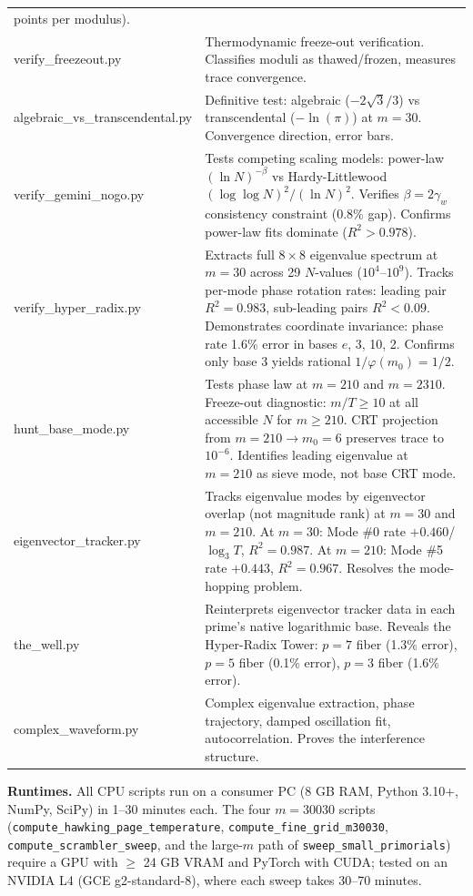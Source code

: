 \documentclass[
  11pt,
]{article}
\numberwithin{equation}{section}
\begin{document}
{\begin{longtable}[]{@{}
  >{\ttfamily\raggedright\arraybackslash}p{}
  >{\raggedright\arraybackslash}p{}@{}}
points per modulus). \\
verify\_freezeout.py & Thermodynamic freeze-out verification.
Classifies moduli as thawed/frozen, measures trace convergence. \\
algebraic\_vs\_transcendental.py & Definitive test: algebraic
(\(-2\sqrt{3}/3\)) vs transcendental (\(-\ln(\pi)\)) at \(m = 30\).
Convergence direction, error bars. \\
verify\_gemini\_nogo.py & Tests competing scaling models:
power-law \((\ln N)^{-\beta}\) vs Hardy-Littlewood
\((\log\log N)^2/(\ln N)^2\). Verifies \(\beta = 2\gamma_w\) consistency
constraint (0.8\% gap). Confirms power-law fits dominate
(\(R^2 > 0.978\)). \\
verify\_hyper\_radix.py & Extracts full \(8\times 8\) eigenvalue spectrum
at \(m = 30\) across 29 \(N\)-values (\(10^4\)--\(10^9\)). Tracks
per-mode phase rotation rates: leading pair \(R^2 = 0.983\), sub-leading
pairs \(R^2 < 0.09\). Demonstrates coordinate invariance: phase rate
1.6\% error in bases \(e\), 3, 10, 2. Confirms only base 3 yields
rational \(1/\varphi(m_0) = 1/2\). \\
hunt\_base\_mode.py & Tests phase law at \(m = 210\) and
\(m = 2310\). Freeze-out diagnostic: \(m/T \geq 10\) at all accessible
\(N\) for \(m \geq 210\). CRT projection from
\(m = 210 \to m_0 = 6\) preserves trace to \(10^{-6}\). Identifies
leading eigenvalue at \(m = 210\) as sieve mode, not base CRT mode. \\
eigenvector\_tracker.py & Tracks eigenvalue modes by
eigenvector overlap (not magnitude rank) at \(m = 30\) and \(m = 210\).
At \(m = 30\): Mode \#0 rate \(+0.460\)/\(\log_3 T\), \(R^2 = 0.987\).
At \(m = 210\): Mode \#5 rate \(+0.443\), \(R^2 = 0.967\).
Resolves the mode-hopping problem. \\
the\_well.py & Reinterprets eigenvector tracker data in each
prime's native logarithmic base. Reveals the Hyper-Radix Tower:
\(p = 7\) fiber (1.3\% error), \(p = 5\) fiber (0.1\% error),
\(p = 3\) fiber (1.6\% error). \\
complex\_waveform.py & Complex eigenvalue extraction, phase
trajectory, damped oscillation fit, autocorrelation. Proves the
interference structure. \\
\end{longtable}
}

\textbf{Runtimes.} All CPU scripts run on a consumer PC (8 GB RAM, Python 3.10+, NumPy, SciPy) in 1--30 minutes each. The four \(m = 30030\) scripts (\texttt{compute\_hawking\_page\_temperature}, \texttt{compute\_fine\_grid\_m30030}, \texttt{compute\_scrambler\_sweep}, and the large-\(m\) path of \texttt{sweep\_small\_primorials}) require a GPU with \(\geq\) 24 GB VRAM and PyTorch with CUDA; tested on an NVIDIA L4 (GCE g2-standard-8), where each sweep takes 30--70 minutes.
\end{document}
